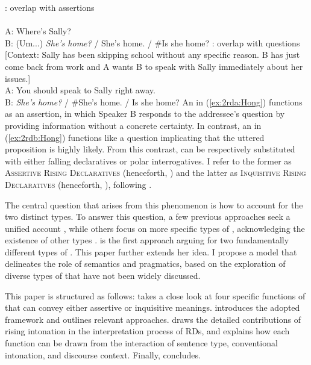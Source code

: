 \documentclass[output=paper,colorlinks,citecolor=brown]{langscibook}
\begin{document}
\ea \label{ex:2rd:Hong}
    \ea \label{ex:2rda:Hong} : overlap with assertions\\
    \justifying{}\\
    A: Where's Sally?\\
    B: (Um...) \textit{She's home?} / She's home. / \#Is she home?
    \ex \label{ex:2rdb:Hong} : overlap with questions\\
    {[Context: Sally has been skipping school without any specific reason. B has just come back from work and A wants B to speak with Sally immediately about her issues.]}\\
    A: You should speak to Sally right away.\\
    B: \textit{She’s home?} / \#She's home. / Is she home?
    \z
\z
An  in (\ref{ex:2rda:Hong}) functions as an assertion, in which Speaker B responds to the addressee's question by providing information without a concrete certainty. In contrast, an  in (\ref{ex:2rdb:Hong}) functions like a question implicating that the uttered proposition is highly likely. From this contrast,  can be respectively substituted with either falling declaratives or polar interrogatives. I refer to the former as \textsc{Assertive Rising Declaratives} (henceforth, ) and the latter as \textsc{Inquisitive Rising Declaratives} (henceforth, ), following \citet{jeong2018intonation}.

The central question that arises from this phenomenon is how to account for the two distinct types. To answer this question, a few previous approaches seek a unified account \citep[e.g.,][]{rudin2022intonational}, while others focus on more specific types of , acknowledging the existence of other types \citep[e.g.,][]{farkas2017division}. \citet{jeong2018intonation} is the first approach arguing for two fundamentally different types of . This paper further extends her idea. I propose a model that delineates the role of semantics and pragmatics, based on the exploration of diverse types of  that have not been widely discussed. 

This paper is structured as follows:  takes a close look at four specific functions of  that can convey either assertive or inquisitive meanings.  introduces the adopted framework and outlines relevant approaches.  draws the detailed contributions of rising intonation in the interpretation process of RDs, and  explains how each function can be drawn from the interaction of sentence type, conventional intonation, and discourse context. Finally,  concludes.
\end{document}
